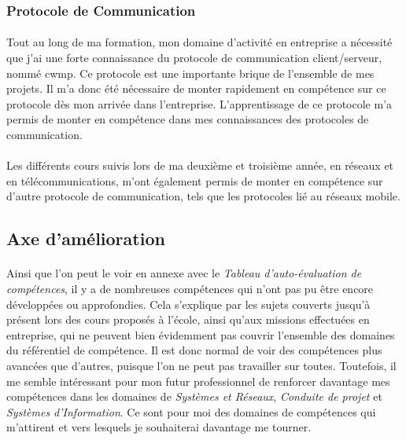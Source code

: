 \documentclass[12pt,a4paper]{report}
\begin{document}
\subsubsection{Protocole de Communication}
\paragraph*{}Tout au long de ma formation, mon domaine d'activité en entreprise a nécessité que j'ai une forte connaissance du protocole de communication client/serveur, nommé \gls{cwmp}. Ce protocole est une importante brique de l'ensemble de mes projets. Il m'a donc été nécessaire de monter rapidement en compétence sur ce protocole dès mon arrivée dans l'entreprise. L’apprentissage de ce protocole m'a permis de monter en compétence dans mes connaissances des protocoles de communication.
\paragraph*{}Les différents cours suivis lors de ma deuxième et troisième année, en réseaux et en télécommunications, m'ont également permis de monter en compétence sur d'autre protocole de communication, tels que les protocoles lié au réseaux mobile. \\
 
\subsection{Axe d'amélioration}
\paragraph*{} Ainsi que l'on peut le voir en annexe avec le \textit{Tableau d'auto-évaluation de compétences}, il y a de nombreuses compétences qui n'ont pas pu être encore développées ou approfondies. Cela s'explique par les sujets couverts jusqu'à présent lors des cours proposés à l'école, ainsi qu'aux missions effectuées en entreprise, qui ne peuvent bien évidemment pas couvrir l'ensemble des domaines du référentiel de compétence. Il est donc normal de voir des compétences plus avancées que d'autres, puisque l'on ne peut pas travailler sur toutes. Toutefois, il me semble intéressant pour mon futur professionnel de renforcer davantage mes compétences dans les domaines de \textit{Systèmes et Réseaux}, \textit{Conduite de projet} et \textit{Systèmes d'Information}. Ce sont pour moi des domaines de compétences qui m'attirent et vers lesquels je souhaiterai davantage me tourner. \\
\end{document}
